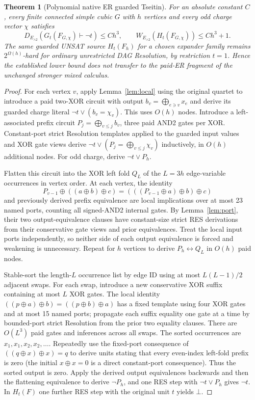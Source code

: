 \documentclass[11pt]{article}
\newtheorem{theorem}{Theorem}
\begin{document}
\begin{theorem}[Polynomial native ER guarded Tseitin]\label{thm:main}
For an absolute constant $C$, every finite connected simple cubic $G$ with $h$ vertices and every odd charge vector $\chi$ satisfies
\[
D_{E_{\land2}}(G_t(F_{G,\chi})\vdash\neg t)\le Ch^3,\qquad
W_{E_{\land2}}(H_t(F_{G,\chi}))\le Ch^3+1.
\]
The same guarded UNSAT source $H_t(F_h)$ for a chosen expander family remains $2^{\Omega(h)}$-hard for ordinary unrestricted DAG Resolution, by restriction $t=1$. Hence the established lower bound does not transfer to the paid-ER fragment of the unchanged stronger mixed calculus.
\end{theorem}
\begin{proof}
For each vertex $v$, apply Lemma~\ref{lem:local} using the original quartet to introduce a paid two-XOR circuit with output $b_v=\bigoplus_{e\ni v}x_e$ and derive its guarded charge literal $\neg t\vee(b_v=\chi_v)$. This uses $O(h)$ nodes. Introduce a left-associated prefix circuit $P_j=\bigoplus_{v\le j}b_v$, three paid AND2 gates per XOR. Constant-port strict Resolution templates applied to the guarded input values and XOR gate views derive $\neg t\vee(P_j=\bigoplus_{v\le j}\chi_v)$ inductively, in $O(h)$ additional nodes. For odd charge, derive $\neg t\vee P_h$.

Flatten this circuit into the XOR left fold $Q_L$ of the $L=3h$ edge-variable occurrences in vertex order. At each vertex, the identity
\[
P_{v-1}\oplus((a\oplus b)\oplus c)
=
(((P_{v-1}\oplus a)\oplus b)\oplus c)
\]
and previously derived prefix equivalence are local implications over at most 23 named ports, counting all signed-AND2 internal gates. By Lemma~\ref{lem:port}, their two output-equivalence clauses have constant-size strict RES derivations from their conservative gate views and prior equivalences. Treat the local input ports independently, so neither side of each output equivalence is forced and weakening is unnecessary. Repeat for $h$ vertices to derive $P_h\leftrightarrow Q_L$ in $O(h)$ paid nodes.

Stable-sort the length-$L$ occurrence list by edge ID using at most $L(L-1)/2$ adjacent swaps. For each swap, introduce a new conservative XOR suffix containing at most $L$ XOR gates. The local identity $((p\oplus a)\oplus b)=((p\oplus b)\oplus a)$ has a fixed template using four XOR gates and at most 15 named ports; propagate each suffix equality one gate at a time by bounded-port strict Resolution from the prior two equality clauses. There are $O(L^3)$ paid gates and inferences across all swaps. The sorted occurrences are $x_1,x_1,x_2,x_2,\ldots$. Repeatedly use the fixed-port consequence of $((q\oplus x)\oplus x)=q$ to derive units stating that every even-index left-fold prefix is zero (the initial $x\oplus x=0$ is a direct constant-port consequence). Thus the sorted output is zero. Apply the derived output equivalences backwards and then the flattening equivalence to derive $\neg P_h$, and one RES step with $\neg t\vee P_h$ gives $\neg t$. In $H_t(F)$ one further RES step with the original unit $t$ yields $\bot$.


\end{proof}
\end{document}
